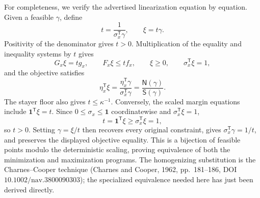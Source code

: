 For completeness, we verify the advertised linearization equation by equation.  Given a feasible \(\gamma\), define
\[t=\frac{1}{\sigma_x^{\mathsf T}\gamma},\qquad \xi=t\gamma.\]
Positivity of the denominator gives \(t>0\).  Multiplication of the equality and inequality systems by \(t\) gives
\[G_x\xi=tg_x,\qquad F_x\xi\le tf_x,\qquad \xi\ge0,\qquad
  \sigma_x^{\mathsf T}\xi=1,\]
and the objective satisfies
\[\eta_x^{\mathsf T}\xi
=\frac{\eta_x^{\mathsf T}\gamma}{\sigma_x^{\mathsf T}\gamma}
=\frac{\mathsf N(\gamma)}{\mathsf S(\gamma)}.\]
The stayer floor also gives \(t\le\kappa^{-1}\).
Conversely, the scaled margin equations include \(\mathbf 1^{\mathsf T}\xi=t\).  Since \(0\le\sigma_x\le\mathbf 1\) coordinatewise and \(\sigma_x^{\mathsf T}\xi=1\),
\[t=\mathbf 1^{\mathsf T}\xi\ge\sigma_x^{\mathsf T}\xi=1,\]
so \(t>0\).  Setting \(\gamma=\xi/t\) then recovers every original constraint, gives \(\sigma_x^{\mathsf T}\gamma=1/t\), and preserves the displayed objective equality.  This is a bijection of feasible points modulo the deterministic scaling, proving equivalence of both the minimization and maximization programs.  The homogenizing substitution is the Charnes--Cooper technique (Charnes and Cooper, 1962, pp.~181--186, DOI \(10.1002/\mathrm{nav}.3800090303\)); the specialized equivalence needed here has just been derived directly.

